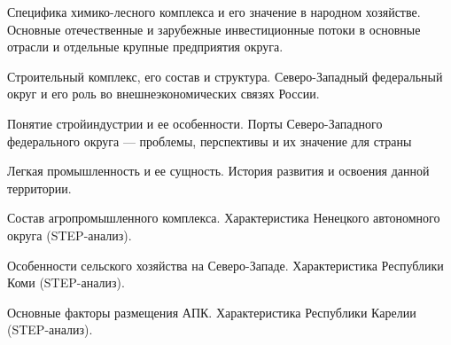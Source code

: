 \documentclass[
	14pt,
	a4paper,
	]
	{scrartcl}
\begin{document}
\vfill

\newpage


\shapk
{}
\setcounter{zad}{0}

\vfill
\z Специфика химико-лесного комплекса и его значение в народном хозяйстве.
 \vfill
\z Основные отечественные и зарубежные инвестиционные потоки в основные отрасли и отдельные крупные предприятия округа.
 \vfill

\vfill

\newpage


\shapk
{}
\setcounter{zad}{0}

\vfill
\z Строительный комплекс, его состав и структура.
 \vfill
\z Северо-Западный федеральный округ и его роль во внешнеэкономических связях России.
 \vfill

\vfill

\newpage


\shapk
{}
\setcounter{zad}{0}

\vfill
\z Понятие стройиндустрии и ее особенности.
 \vfill
\z Порты Северо-Западного федерального округа --- проблемы, перспективы и их значение для страны
 \vfill

\vfill

\newpage


\shapk
{}
\setcounter{zad}{0}

\vfill
\z Легкая промышленность и ее сущность.
 \vfill
\z История развития и освоения данной территории.
 \vfill

\vfill

\newpage


\shapk
{}
\setcounter{zad}{0}

\vfill
\z Состав агропромышленного комплекса.
 \vfill
\z Характеристика Ненецкого автономного округа (STEP-анализ).
 \vfill

\vfill

\newpage


\shapk
{}
\setcounter{zad}{0}

\vfill
\z Особенности сельского хозяйства на Северо-Западе.
 \vfill
\z Характеристика Республики Коми (STEP-анализ).
 \vfill

\vfill

\newpage


\shapk
{}
\setcounter{zad}{0}

\vfill
\z Основные факторы размещения АПК.
 \vfill
\z Характеристика Республики Карелии (STEP-анализ).
 \vfill
\end{document}
